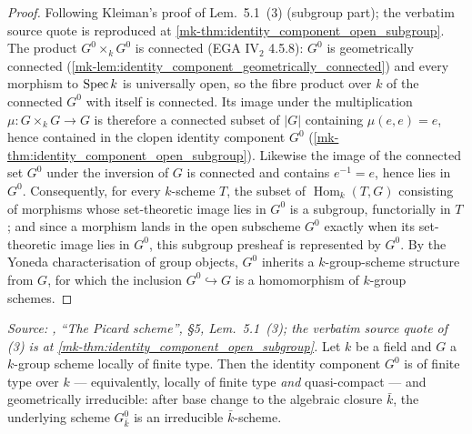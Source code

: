 \begin{proof}
  \leanok
  Following Kleiman's proof of Lem.~5.1~(3) (subgroup part); the
  verbatim source quote is reproduced at
  \ref{mk-thm:identity_component_open_subgroup}.
  The product \(G^0 \times_k G^0\) is connected (EGA IV\(_2\) 4.5.8):
  \(G^0\) is geometrically connected
  (\ref{mk-lem:identity_component_geometrically_connected}) and every
  morphism to \(\operatorname{Spec} k\) is universally open, so the fibre product over
  \(k\) of the connected \(G^0\) with itself is connected. Its image under
  the multiplication \(\mu : G \times_k G \to G\) is therefore a connected
  subset of \(|G|\) containing \(\mu(e, e) = e\), hence contained in the
  clopen identity component \(G^0\)
  (\ref{mk-thm:identity_component_open_subgroup}). Likewise the image of the
  connected set \(G^0\) under the inversion of \(G\) is connected and
  contains \(e^{-1} = e\), hence lies in \(G^0\). Consequently, for every
  \(k\)-scheme \(T\), the subset of \(\operatorname{Hom}_k(T, G)\)
  consisting of morphisms whose set-theoretic image lies in \(G^0\) is a
  subgroup, functorially in \(T\); and since a morphism lands in the open
  subscheme \(G^0\) exactly when its set-theoretic image lies in \(G^0\),
  this subgroup presheaf is represented by \(G^0\). By the Yoneda
  characterisation of group objects, \(G^0\) inherits a \(k\)-group-scheme
  structure from \(G\), for which the inclusion \(G^0 \hookrightarrow G\)
  is a homomorphism of \(k\)-group schemes.
\end{proof}

\begin{theorem}\label{mk-thm:identity_component_finite_type_geom_irreducible}
  \leanok

  \textit{Source: \cite{kleiman-picard}, ``The Picard scheme'', \S 5,
  Lem.~5.1~(3); the verbatim source quote of (3) is at
  \ref{mk-thm:identity_component_open_subgroup}.}
  Let \(k\) be a field and \(G\) a \(k\)-group scheme locally of finite
  type. Then the identity component \(G^0\) is of finite type over
  \(k\) --- equivalently, locally of finite type \emph{and}
  quasi-compact --- and geometrically irreducible: after base change
  to the algebraic closure \(\bar k\), the underlying scheme
  \(G^0_{\bar k}\) is an irreducible \(\bar k\)-scheme.
\end{theorem}

